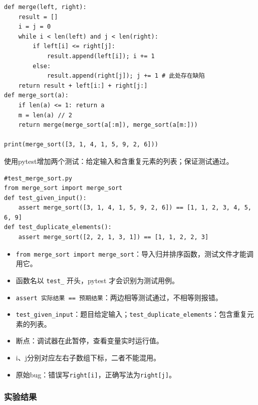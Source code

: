 \documentclass[UTF8,a4paper,11pt]{ctexart}
\begin{document}
\begin{lstlisting}[style=source]
def merge(left, right):
    result = []
    i = j = 0
    while i < len(left) and j < len(right):
        if left[i] <= right[j]:
            result.append(left[i]); i += 1
        else:
            result.append(right[j]); j += 1 # 此处存在缺陷
    return result + left[i:] + right[j:]
def merge_sort(a):
    if len(a) <= 1: return a
    m = len(a) // 2
    return merge(merge_sort(a[:m]), merge_sort(a[m:]))

print(merge_sort([3, 1, 4, 1, 5, 9, 2, 6]))
\end{lstlisting}

使用pytest增加两个测试：给定输入和含重复元素的列表；保证测试通过。

\begin{lstlisting}[style=source]
#test_merge_sort.py
from merge_sort import merge_sort
def test_given_input():
    assert merge_sort([3, 1, 4, 1, 5, 9, 2, 6]) == [1, 1, 2, 3, 4, 5, 6, 9]
def test_duplicate_elements():
    assert merge_sort([2, 2, 1, 3, 1]) == [1, 1, 2, 2, 3]
\end{lstlisting}


\begin{itemize}[leftmargin=2em,itemsep=0.2em,topsep=0.3em]
    \small
    \item \texttt{from merge\_sort import merge\_sort}：导入归并排序函数，测试文件才能调用它。
    \item 函数名以 \texttt{test\_} 开头，pytest 才会识别为测试用例。
    \item \texttt{assert 实际结果 == 预期结果}：两边相等测试通过，不相等则报错。
    \item \texttt{test\_given\_input}：题目给定输入；\texttt{test\_duplicate\_elements}：包含重复元素的列表。
\end{itemize}



\begin{itemize}[leftmargin=2em,itemsep=0.2em,topsep=0.3em]
    \small
    \item 断点：调试器在此暂停，查看变量实时运行值。
    \item i、j分别对应左右子数组下标，二者不能混用。
    \item 原始bug：错误写\texttt{right[i]}，正确写法为\texttt{right[j]}。
\end{itemize}


\subsubsection{实验结果}
\end{document}
